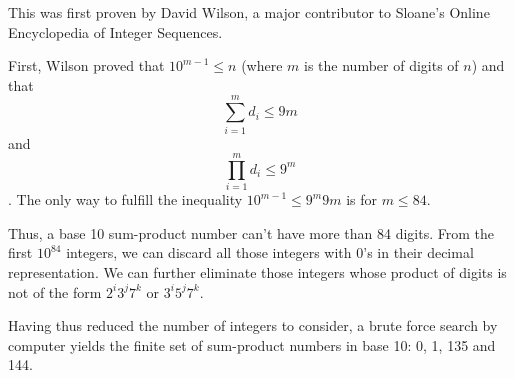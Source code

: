 \documentclass[12pt]{article}
\begin{document}
This was first proven by David Wilson, a major contributor to Sloane's Online Encyclopedia of Integer Sequences.

First, Wilson proved that $10^{m - 1} \le n$ (where $m$ is the number of digits of $n$) and that $$\sum_{i = 1}^m d_i \le 9m$$ and $$\prod_{i = 1}^m d_i \le 9^m$$. The only way to fulfill the inequality $10^{m - 1} \le 9^m9m$ is for $m \le 84$.

Thus, a base 10 sum-product number can't have more than 84 digits. From the first $10^{84}$ integers, we can discard all those integers with 0's in their decimal representation. We can further eliminate those integers whose product of digits is not of the form $2^i3^j7^k$ or $3^i5^j7^k$.

Having thus reduced the number of integers to consider, a brute force search by computer yields the finite set of sum-product numbers in base 10: 0, 1, 135 and 144.
\end{document}
